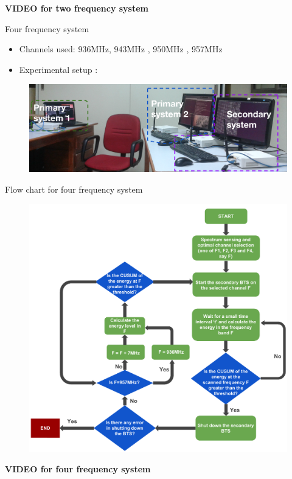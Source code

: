 \documentclass{beamer}
\begin{document}
  \begin{frame}[c]
    \begin{center}
      \LARGE \textbf{VIDEO for two frequency system}
    \end{center}
  \end{frame}


  
  \begin{frame}{Four frequency system}
    \begin{itemize}
      \item Channels used: 936MHz, 943MHz , 950MHz , 957MHz
      \item Experimental setup :
    \end{itemize}
    \begin{figure}
      \centering
      \includegraphics[width=0.97\linewidth]{img/freq4}
    \end{figure}
  \end{frame}
  
  \begin{frame}{Flow chart for four frequency system}
    \begin{figure}
      \centering
      \includegraphics[height=0.9\textheight]{img/freqSys4}
    \end{figure}
  \end{frame}

  \begin{frame}[c]
    \begin{center}
      \LARGE \textbf{VIDEO for four frequency system}
    \end{center}
  \end{frame}
    
\end{document}
